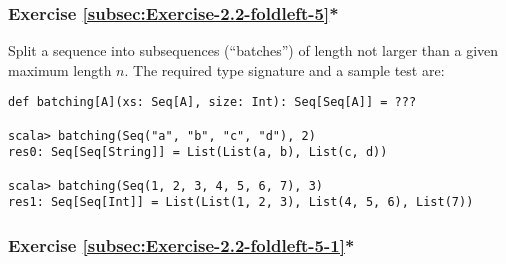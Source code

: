 \subsubsection{Exercise \label{subsec:Exercise-2.2-foldleft-5}\ref{subsec:Exercise-2.2-foldleft-5}{*}}

Split a sequence into subsequences (``batches'') of length not larger
than a given maximum length $n$. The required type signature and
a sample test are:
\begin{lstlisting}
def batching[A](xs: Seq[A], size: Int): Seq[Seq[A]] = ???

scala> batching(Seq("a", "b", "c", "d"), 2)
res0: Seq[Seq[String]] = List(List(a, b), List(c, d))

scala> batching(Seq(1, 2, 3, 4, 5, 6, 7), 3)
res1: Seq[Seq[Int]] = List(List(1, 2, 3), List(4, 5, 6), List(7))
\end{lstlisting}
\begin{comment}
Solution:\inputencoding{latin9}
\begin{lstlisting}
def batching[A](xs: Seq[A], size: Int): Seq[Seq[A]] = {  
  type Acc = (Seq[Seq[A]], Seq[A], Int)
  val init: Acc = ((Seq(), Seq(), 0))
  val (result, rem, _) = xs.foldLeft(init){ case ((seq, rem, len), x) =>
    val newLen = len + 1
    if (newLen > size) (seq ++ Seq(rem), Seq(x), 1)
    else (seq, rem ++ Seq(x), newLen)
  }
  result ++ Seq(rem)
}
\end{lstlisting}
\inputencoding{utf8}\end{comment}


\subsubsection{Exercise \label{subsec:Exercise-2.2-foldleft-5-1}\ref{subsec:Exercise-2.2-foldleft-5-1}{*}}

